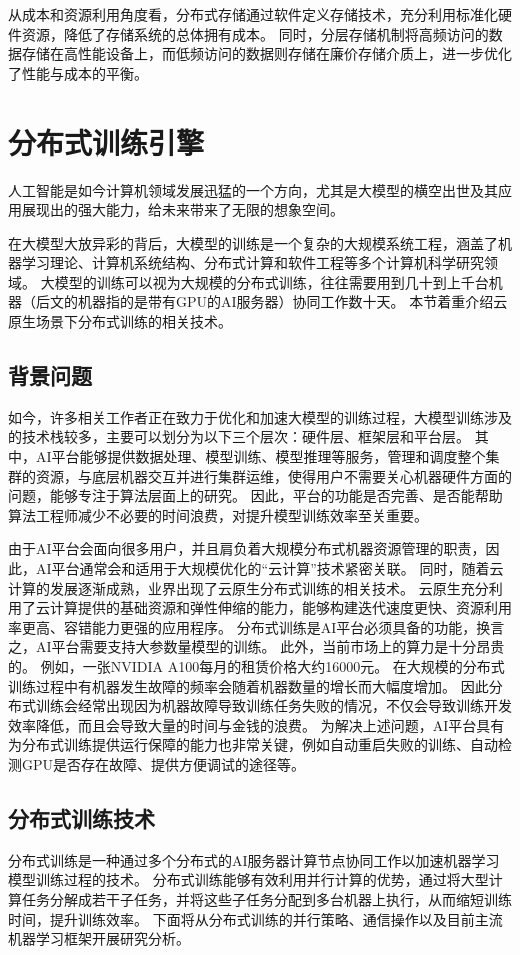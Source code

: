 从成本和资源利用角度看，分布式存储通过软件定义存储技术，充分利用标准化硬件资源，降低了存储系统的总体拥有成本。
同时，分层存储机制将高频访问的数据存储在高性能设备上，而低频访问的数据则存储在廉价存储介质上，进一步优化了性能与成本的平衡。


\section{分布式训练引擎}

人工智能是如今计算机领域发展迅猛的一个方向，尤其是大模型的横空出世及其应用展现出的强大能力，给未来带来了无限的想象空间。

在大模型大放异彩的背后，大模型的训练是一个复杂的大规模系统工程，涵盖了机器学习理论、计算机系统结构、分布式计算和软件工程等多个计算机科学研究领域。
大模型的训练可以视为大规模的分布式训练，往往需要用到几十到上千台机器（后文的机器指的是带有GPU的AI服务器）协同工作数十天。
本节着重介绍云原生场景下分布式训练的相关技术。

\subsection{背景问题}
如今，许多相关工作者正在致力于优化和加速大模型的训练过程，大模型训练涉及的技术栈较多，主要可以划分为以下三个层次：硬件层、框架层和平台层。
其中，AI平台能够提供数据处理、模型训练、模型推理等服务，管理和调度整个集群的资源，与底层机器交互并进行集群运维，使得用户不需要关心机器硬件方面的问题，能够专注于算法层面上的研究。
因此，平台的功能是否完善、是否能帮助算法工程师减少不必要的时间浪费，对提升模型训练效率至关重要。

由于AI平台会面向很多用户，并且肩负着大规模分布式机器资源管理的职责，因此，AI平台通常会和适用于大规模优化的“云计算”技术紧密关联。
同时，随着云计算的发展逐渐成熟，业界出现了云原生分布式训练的相关技术。
云原生充分利用了云计算提供的基础资源和弹性伸缩的能力，能够构建迭代速度更快、资源利用率更高、容错能力更强的应用程序。
分布式训练是AI平台必须具备的功能，换言之，AI平台需要支持大参数量模型的训练。
此外，当前市场上的算力是十分昂贵的。
例如，一张NVIDIA A100每月的租赁价格大约16000元。
在大规模的分布式训练过程中有机器发生故障的频率会随着机器数量的增长而大幅度增加。
因此分布式训练会经常出现因为机器故障导致训练任务失败的情况，不仅会导致训练开发效率降低，而且会导致大量的时间与金钱的浪费。
为解决上述问题，AI平台具有为分布式训练提供运行保障的能力也非常关键，例如自动重启失败的训练、自动检测GPU是否存在故障、提供方便调试的途径等。

\subsection{分布式训练技术}
分布式训练是一种通过多个分布式的AI服务器计算节点协同工作以加速机器学习模型训练过程的技术。
分布式训练能够有效利用并行计算的优势，通过将大型计算任务分解成若干子任务，并将这些子任务分配到多台机器上执行，从而缩短训练时间，提升训练效率。
下面将从分布式训练的并行策略、通信操作以及目前主流机器学习框架开展研究分析。

